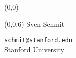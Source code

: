 \begin{textblock}{15}(0,0)
\end{textblock}

\begin{textblock}{15}(0,0.6)
{
\LARGE
Sven Schmit
}

\texttt{schmit@stanford.edu}\\

{
\Large
\color{gray}
Stanford University
}

\end{textblock}



